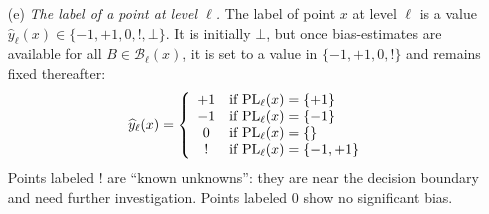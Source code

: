 \documentclass{article}
\def\B{{\mathcal B}}
\def\yh{{\widehat{y}}}
\def\PL{{\rm PL}}
\begin{document}
\begin{enumerate}
\begin{enumerate}
\item[(e)] {\it The label of a point at level $\ell$.} The label of point $x$ at level $\ell$ is a value $\yh_\ell(x) \in \{-1,+1,0,!,\bot\}$. It is initially $\bot$, but once bias-estimates are available for all $B \in \B_\ell(x)$, it is set to a value in $\{-1,+1,0,!\}$ and remains fixed thereafter:
\begin{equation}
\yh_\ell(x) = 
\left\{
\begin{array}{cl}
+1 & \mbox{if $\PL_\ell(x) = \{+1\}$} \\
-1 &  \mbox{if $\PL_\ell(x) = \{-1\}$} \\
0 & \mbox{if $\PL_\ell(x) = \{\}$} \\
! & \mbox{if $\PL_\ell(x) = \{-1,+1\}$}
\end{array}
\right.
\label{eq:provisional-label}
\end{equation}
Points labeled $!$ are ``known unknowns'': they are near the decision boundary and need further investigation. Points labeled $0$ show no significant bias.

\end{enumerate}

\end{enumerate}
\end{document}
